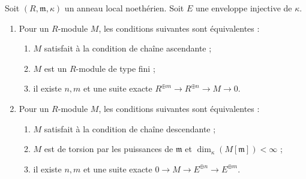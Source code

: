 \begin{lemma}
\label{lemma-describe-categories}
Soit $(R, \mathfrak m, \kappa)$ un anneau local noethérien.
Soit $E$ une enveloppe injective de $\kappa$.
\begin{enumerate}
\item Pour un $R$-module $M$, les conditions suivantes sont équivalentes :
\begin{enumerate}
\item $M$ satisfait à la condition de chaîne ascendante ;
\item $M$ est un $R$-module de type fini ;
\item il existe $n, m$ et une suite exacte
$R^{\oplus m} \to R^{\oplus n} \to M \to 0$.
\end{enumerate}
\item Pour un $R$-module $M$, les conditions suivantes sont équivalentes :
\begin{enumerate}
\item $M$ satisfait à la condition de chaîne descendante ;
\item $M$ est de torsion par les puissances de $\mathfrak m$ et
$\dim_\kappa(M[\mathfrak m]) < \infty$ ;
\item il existe $n, m$ et une suite exacte
$0 \to M \to E^{\oplus n} \to E^{\oplus m}$.
\end{enumerate}
\end{enumerate}
\end{lemma}

